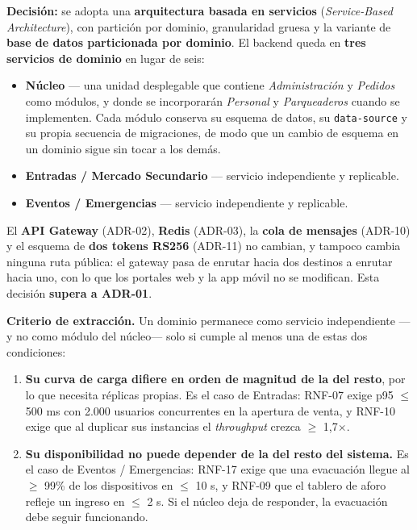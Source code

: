 \documentclass[11pt,a4paper]{article}
\begin{document}
\textbf{Decisión:} se adopta una \textbf{arquitectura basada en servicios}
(\textit{Service-Based Architecture}), con partición por dominio, granularidad gruesa y la variante
de \textbf{base de datos particionada por dominio}. El backend queda en \textbf{tres servicios de
dominio} en lugar de seis:

\begin{itemize}
  \item \textbf{Núcleo} --- una unidad desplegable que contiene \textit{Administración} y
        \textit{Pedidos} como módulos, y donde se incorporarán \textit{Personal} y
        \textit{Parqueaderos} cuando se implementen. Cada módulo conserva su esquema de datos, su
        \texttt{data-source} y su propia secuencia de migraciones, de modo que un cambio de esquema
        en un dominio sigue sin tocar a los demás.
  \item \textbf{Entradas / Mercado Secundario} --- servicio independiente y replicable.
  \item \textbf{Eventos / Emergencias} --- servicio independiente y replicable.
\end{itemize}

El \textbf{API Gateway} (ADR-02), \textbf{Redis} (ADR-03), la \textbf{cola de mensajes} (ADR-10) y
el esquema de \textbf{dos tokens RS256} (ADR-11) no cambian, y tampoco cambia ninguna ruta pública:
el gateway pasa de enrutar hacia dos destinos a enrutar hacia uno, con lo que los portales web y la
app móvil no se modifican. Esta decisión \textbf{supera a ADR-01}.

\textbf{Criterio de extracción.} Un dominio permanece como servicio independiente ---y no como
módulo del núcleo--- solo si cumple al menos una de estas dos condiciones:

\begin{enumerate}
  \item \textbf{Su curva de carga difiere en orden de magnitud de la del resto}, por lo que necesita
        réplicas propias. Es el caso de Entradas: RNF-07 exige p95 $\leq$ 500 ms con 2.000 usuarios
        concurrentes en la apertura de venta, y RNF-10 exige que al duplicar sus instancias el
        \textit{throughput} crezca $\geq$ 1,7$\times$.
  \item \textbf{Su disponibilidad no puede depender de la del resto del sistema.} Es el caso de
        Eventos / Emergencias: RNF-17 exige que una evacuación llegue al $\geq$ 99\% de los
        dispositivos en $\leq$ 10 s, y RNF-09 que el tablero de aforo refleje un ingreso en
        $\leq$ 2 s. Si el núcleo deja de responder, la evacuación debe seguir funcionando.
\end{enumerate}
\end{document}
